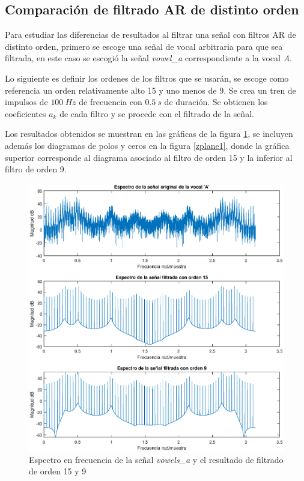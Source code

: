 \subsection{Comparación de filtrado AR de distinto orden}

Para estudiar las diferencias de resultados al filtrar una señal con filtros AR de distinto orden, primero se escoge una señal de vocal arbitraria para que sea filtrada, en este caso se escogió la señal \textit{vowel\_a} correspondiente a la vocal \textit{A}.

Lo siguiente es definir los ordenes de los filtros que se usarán, se escoge como referencia un orden relativamente alto 15 y uno menos de 9. Se crea un tren de impulsos de $100~Hz$ de frecuencia  con $0.5~s$ de duración. Se obtienen los coeficientes $a_k$ de cada filtro y se procede con el filtrado de la señal.

Los resultados obtenidos se muestran en las gráficas de la figura \ref{AR-15-9}, se incluyen además los diagramas de polos y ceros en la figura \ref{zplane1}, donde la gráfica superior corresponde al diagrama asociado al filtro de orden 15 y la inferior al filtro de orden 9.


\begin{figure}[H]
    \centering
    \includegraphics[scale = 0.6]{figures/4_3_filtradoAR.eps}
    \caption{Espectro en frecuencia de la señal \textit{vowels\_a} y el resultado de filtrado de orden 15 y 9 }
    \label{AR-15-9}
\end{figure}

